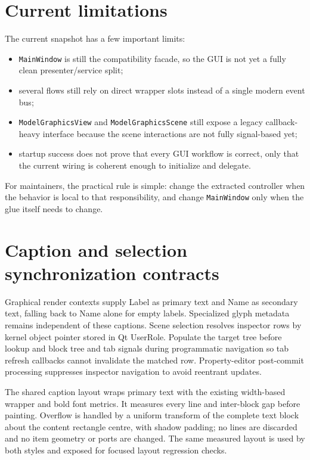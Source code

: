 \section{Current limitations}
\label{sec:gui-architecture-limitations}

The current snapshot has a few important limits:
\begin{itemize}
\item \texttt{MainWindow} is still the compatibility facade, so the GUI is not yet a fully clean presenter/service split;
\item several flows still rely on direct wrapper slots instead of a single modern event bus;
\item \texttt{ModelGraphicsView} and \texttt{ModelGraphicsScene} still expose a legacy callback-heavy interface because the scene interactions are not fully signal-based yet;
\item startup success does not prove that every GUI workflow is correct, only that the current wiring is coherent enough to initialize and delegate.
\end{itemize}

For maintainers, the practical rule is simple: change the extracted controller when the behavior is local to that responsibility, and change \texttt{MainWindow} only when the glue itself needs to change.

\section{Caption and selection synchronization contracts}
Graphical render contexts supply Label as primary text and Name as secondary text,
falling back to Name alone for empty labels. Specialized glyph metadata remains
independent of these captions. Scene selection resolves inspector rows by kernel
object pointer stored in Qt UserRole. Populate the target tree before lookup and
block tree and tab signals during programmatic navigation so tab refresh callbacks
cannot invalidate the matched row. Property-editor post-commit processing suppresses
inspector navigation to avoid reentrant updates.

The shared caption layout wraps primary text with the existing width-based wrapper
and bold font metrics. It measures every line and inter-block gap before painting.
Overflow is handled by a uniform transform of the complete text block about the
content rectangle centre, with shadow padding; no lines are discarded and no item
geometry or ports are changed. The same measured layout is used by both styles
and exposed for focused layout regression checks.

